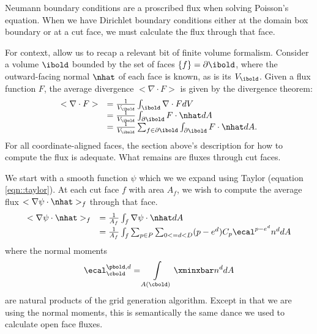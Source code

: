 \documentclass{article}
\begin{document}
{Neumann boundary conditions are a proscribed flux when solving
Poisson's equation.     When we have Dirichlet boundary conditions
either at the domain box boundary or at a cut face, we must calculate
the flux through that face.

For context, allow us to recap a relevant bit of finite volume formalism.
Consider a volume $\ibold$ bounded by the set of faces
$\{f\}  = \partial \ibold$, where the outward-facing normal $\nhat$ of
each face is known, as is its  $V_\ibold$.
Given a flux function $F$, the average divergence $< \nabla \cdot F >$
is given by the divergence theorem:
\begin{equation}
\begin{array}{l l}
< \nabla \cdot F > &= \frac{1}{V_\ibold} \int_\ibold \nabla \cdot F dV \\
           &= \frac{1}{V_\ibold} \int_{\partial \ibold} F\cdot \nhat dA \\
           &= \frac{1}{V_\ibold} \sum_{f \in \partial
  \ibold}\int_{\partial \ibold} F\cdot \nhat dA.
\end{array}
\label{eqn::discreteDivergence}
\end{equation}
For all coordinate-aligned faces, the section above's description for how to
compute the flux is adequate.   What remains are fluxes through cut
faces.

We start with a smooth function $\psi$ which we we expand using Taylor
(equation \ref{eqn::taylor}).  At each cut face $f$ with area $A_f$,
we wish to compute the average flux $< \nabla \psi \cdot \nhat >_f$
through that face.
\begin{equation}
\begin{array}{l l }
  < \nabla \psi \cdot \nhat >_f
  &= \frac{1}{A_f} \int_f \nabla \psi \cdot \nhat dA \\
  &= \frac{1}{A_f} \int_f \sum_{p \in P} \sum_{0 <= d <D}  (p-e^d) C_p
  \ecal^{p-e^d} n^d dA
\end{array}
\end{equation}
where the normal moments
\begin{equation}
\ecal^{\pbold, d}_\cbold  =  \int\limits_{A(\cbold)} \xminxbar n^d  dA
\end{equation}
are natural products of the \cite{Schwartz2015} grid generation
algorithm.   Except in that we are using the normal moments, this is
semantically the same dance we used to calculate open face fluxes.

}
\end{document}
